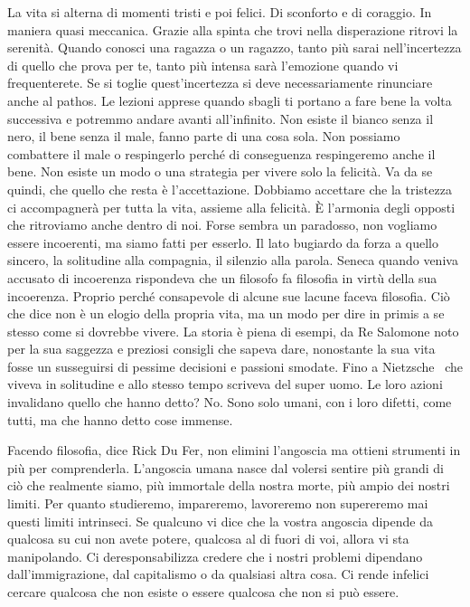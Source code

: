 \documentclass[12pt]{book} %
\begin{document}
La vita si alterna di momenti tristi e poi felici. Di sconforto e di coraggio. In maniera quasi meccanica. Grazie alla
spinta che trovi nella disperazione ritrovi la serenità. Quando conosci una ragazza o un ragazzo, tanto più sarai
nell'incertezza di quello che prova per te, tanto più intensa sarà l'emozione
quando vi frequenterete. Se si toglie quest'incertezza si deve necessariamente rinunciare anche al
pathos. Le lezioni apprese quando sbagli ti portano a fare bene la volta successiva e potremmo andare avanti
all'infinito. Non esiste il bianco senza il nero, il bene senza il male, fanno parte di una cosa
sola. Non possiamo combattere il male o respingerlo perché di conseguenza respingeremo anche il bene. Non esiste un
modo o una strategia per vivere solo la felicità. Va da se quindi, che quello che resta è
l'accettazione. Dobbiamo accettare che la tristezza ci accompagnerà per tutta la vita, assieme
alla felicità. È l'armonia degli opposti che ritroviamo anche dentro di noi. Forse sembra un
paradosso, non vogliamo essere incoerenti, ma siamo fatti per esserlo. Il lato bugiardo da forza a quello sincero, la
solitudine alla compagnia, il silenzio alla parola. Seneca quando veniva accusato di incoerenza rispondeva che un
filosofo fa filosofia in virtù della sua incoerenza. Proprio perché consapevole di alcune sue lacune faceva filosofia.
Ciò che dice non è un elogio della propria vita, ma un modo per dire in primis a se stesso come si dovrebbe vivere. La
storia è piena di esempi, da Re Salomone noto per la sua saggezza e preziosi consigli che sapeva dare, nonostante la
sua vita fosse un susseguirsi di pessime decisioni e passioni smodate. Fino a Nietzsche \ che viveva in solitudine e
allo stesso tempo scriveva del super uomo. Le loro azioni invalidano quello che hanno detto? No. Sono solo umani, con i
loro difetti, come tutti, ma che hanno detto cose immense.

Facendo filosofia, dice Rick Du Fer, non elimini l'angoscia ma ottieni strumenti in più per comprenderla. L'angoscia
umana nasce dal volersi sentire più grandi di ciò che realmente siamo, più immortale della nostra morte, più ampio dei
nostri limiti. Per quanto studieremo, impareremo, lavoreremo non supereremo mai questi limiti intrinseci. Se qualcuno
vi dice che la vostra angoscia dipende da qualcosa su cui non avete potere, qualcosa al di fuori di voi, allora vi sta
manipolando. Ci deresponsabilizza credere che i nostri problemi dipendano dall'immigrazione, dal
capitalismo o da qualsiasi altra cosa. Ci rende infelici cercare qualcosa che non esiste o essere qualcosa che non si
può essere.
\end{document}
